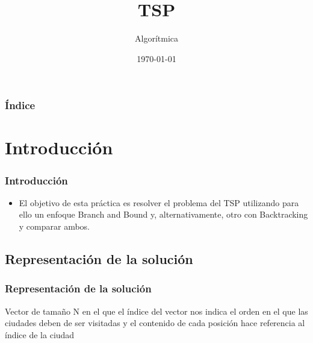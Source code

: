 \documentclass{beamer}
\title[Práctica 4]{TSP} %
\author{Algorítmica} %
\institute[UGR] %
{
	Universidad de Granada \\ %
	\medskip
	
}
\date{\today} %
\begin{document}
	
	\begin{frame}
		\titlepage %
	\end{frame}
	
	\begin{frame}
		\frametitle{Índice} %
		\tableofcontents %
	\end{frame}
	
	
	\section{Introducción }
	\begin{frame}
		\frametitle{Introducción}
		\begin{itemize}
			\item El objetivo de esta práctica es resolver el problema del TSP utilizando para ello un enfoque Branch and Bound y, alternativamente, otro con Backtracking y comparar ambos.
		\end{itemize}
	\end{frame}
	
	


\begin{frame}
		\section{Representación de la solución} 
				\frametitle{Representación de la solución}
		
		Vector de tamaño N en el que el índice del vector nos indica el orden en el que las ciudades deben de ser visitadas y el contenido de cada posición hace referencia al índice de la ciudad
	\end{frame}
\end{document}
